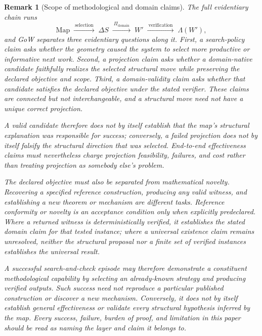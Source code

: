 \documentclass[11pt]{article}
\theoremstyle{gowthm}
\newtheorem{remark}{Remark}[section]
\theoremstyle{gowplain}
\begin{document}
\begin{remark}[Scope of methodological and domain claims]
\label{rem:claim-scope}
The full evidentiary chain runs
\[
\text{Map} \;\xrightarrow{\ \text{selection}\ }\; \Delta S
\;\xrightarrow{\ \Pi_{\text{domain}}\ }\; W'
\;\xrightarrow{\ \text{verification}\ }\; \Lambda(W'),
\]
and GoW separates three evidentiary questions along it. First, a
\emph{search-policy claim} asks whether the geometry caused the system to
select more productive or informative next work. Second, a \emph{projection
claim} asks whether a domain-native candidate faithfully realizes the selected
structural move while preserving the declared objective and scope. Third, a
\emph{domain-validity claim} asks whether that candidate satisfies the declared
objective under the stated verifier. These claims are connected but not
interchangeable, and a structural move need not have a unique correct
projection.

A valid candidate therefore does not by itself establish that the map's
structural explanation was responsible for success; conversely, a failed
projection does not by itself falsify the structural direction that was
selected. End-to-end effectiveness claims must nevertheless charge projection
feasibility, failures, and cost rather than treating projection as somebody
else's problem.

The declared objective must also be separated from mathematical novelty.
Recovering a specified reference construction, producing any valid witness, and
establishing a new theorem or mechanism are different tasks. Reference
conformity or novelty is an acceptance condition only when explicitly
predeclared. Where a returned witness is deterministically verified, it
establishes the stated domain claim for that tested instance; where a universal
existence claim remains unresolved, neither the structural proposal nor a
finite set of verified instances establishes the universal result.

A successful search-and-check episode may therefore demonstrate a constituent
methodological capability by selecting an already-known strategy and producing
verified outputs. Such success need not reproduce a particular published
construction or discover a new mechanism. Conversely, it does not by itself
establish general effectiveness or validate every structural hypothesis
inferred by the map. Every success, failure, burden of proof, and limitation
in this paper should be read as naming the layer and claim it belongs to.
\end{remark}
\end{document}
